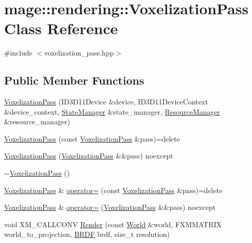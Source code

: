 \hypertarget{classmage_1_1rendering_1_1_voxelization_pass}{}\section{mage\+:\+:rendering\+:\+:Voxelization\+Pass Class Reference}
\label{classmage_1_1rendering_1_1_voxelization_pass}


{\ttfamily \#include $<$voxelization\+\_\+pass.\+hpp$>$}

\subsection*{Public Member Functions}
\begin{DoxyCompactItemize}
\item 
\hyperlink{classmage_1_1rendering_1_1_voxelization_pass_a5ffb9a465e954b6795bc49dfdd8a21d8}{Voxelization\+Pass} (I\+D3\+D11\+Device \&device, I\+D3\+D11\+Device\+Context \&device\+\_\+context, \hyperlink{classmage_1_1rendering_1_1_state_manager}{State\+Manager} \&state\+\_\+manager, \hyperlink{classmage_1_1rendering_1_1_resource_manager}{Resource\+Manager} \&resource\+\_\+manager)
\item 
\hyperlink{classmage_1_1rendering_1_1_voxelization_pass_a74f9898700c2d2877ec663fe23a85670}{Voxelization\+Pass} (const \hyperlink{classmage_1_1rendering_1_1_voxelization_pass}{Voxelization\+Pass} \&pass)=delete
\item 
\hyperlink{classmage_1_1rendering_1_1_voxelization_pass_abbdf28fc21b6b4fe4eebf8ed02ac015d}{Voxelization\+Pass} (\hyperlink{classmage_1_1rendering_1_1_voxelization_pass}{Voxelization\+Pass} \&\&pass) noexcept
\item 
\hyperlink{classmage_1_1rendering_1_1_voxelization_pass_ab989ce6ec60745d7339a1288554dd400}{$\sim$\+Voxelization\+Pass} ()
\item 
\hyperlink{classmage_1_1rendering_1_1_voxelization_pass}{Voxelization\+Pass} \& \hyperlink{classmage_1_1rendering_1_1_voxelization_pass_a30bf15dac8660764cd1342a4f397e47e}{operator=} (const \hyperlink{classmage_1_1rendering_1_1_voxelization_pass}{Voxelization\+Pass} \&pass)=delete
\item 
\hyperlink{classmage_1_1rendering_1_1_voxelization_pass}{Voxelization\+Pass} \& \hyperlink{classmage_1_1rendering_1_1_voxelization_pass_ac7beb95fbf6fd85355703854ac282e91}{operator=} (\hyperlink{classmage_1_1rendering_1_1_voxelization_pass}{Voxelization\+Pass} \&\&pass) noexcept
\item 
void X\+M\+\_\+\+C\+A\+L\+L\+C\+O\+NV \hyperlink{classmage_1_1rendering_1_1_voxelization_pass_a6da986734b83ddaa133dc0a7605cb7e5}{Render} (const \hyperlink{classmage_1_1rendering_1_1_world}{World} \&world, F\+X\+M\+M\+A\+T\+R\+IX world\+\_\+to\+\_\+projection, \hyperlink{namespacemage_1_1rendering_ab8fe8684ca4bd74ba3a394b00cf125b5}{B\+R\+DF} brdf, size\+\_\+t resolution)
\end{DoxyCompactItemize}
